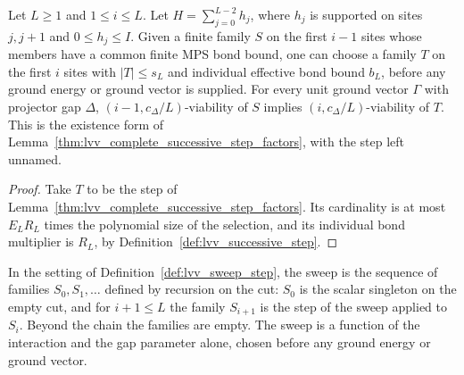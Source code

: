 \begin{lemma}
    \label{thm:lvv_complete_successive_step}
    \leanok
    Let $L\ge1$ and $1\le i\le L$. Let
    $H=\sum_{j=0}^{L-2}h_j$, where $h_j$ is supported on sites $j,j+1$ and
    $0\le h_j\le I$. Given a finite family $S$ on the first $i-1$ sites whose
    members have a common finite MPS bond bound, one can choose a family $T$
    on the first $i$ sites with $|T|\le s_L$ and individual effective bond
    bound $b_L$, before any ground energy or ground vector is supplied.
    For every unit ground vector $\Gamma$ with projector gap $\Delta$,
    $(i-1,c_\Delta/L)$-viability of $S$ implies $(i,c_\Delta/L)$-viability of $T$.
    This is the existence form of
    Lemma~\ref{thm:lvv_complete_successive_step_factors}, with the step
    left unnamed.
\end{lemma}
\begin{proof}
    \leanok
    Take $T$ to be the step of
    Lemma~\ref{thm:lvv_complete_successive_step_factors}. Its cardinality
    is at most $E_LR_L$ times the polynomial size of the selection, and its
    individual bond multiplier is $R_L$, by
    Definition~\ref{def:lvv_successive_step}.
\end{proof}

\begin{definition}
    \label{def:lvv_sweep}
    \leanok
    In the setting of Definition~\ref{def:lvv_sweep_step}, the sweep is the
    sequence of families $S_0,S_1,\ldots$ defined by recursion on the cut:
    $S_0$ is the scalar singleton on the empty cut, and for $i+1\le L$ the
    family $S_{i+1}$ is the step of the sweep applied to $S_i$. Beyond the
    chain the families are empty. The sweep is a function of the interaction
    and the gap parameter alone, chosen before any ground energy or ground
    vector.
\end{definition}

